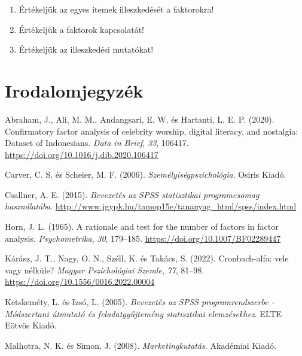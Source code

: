 \documentclass[
  letterpaper,
]{krantz}
\providecommand{\tightlist}{%
  \setlength{\itemsep}{0pt}\setlength{\parskip}{0pt}}\usepackage{longtable,booktabs,array}
\newlength{\cslhangindent}
\newlength{\cslentryspacingunit} %
\newenvironment{CSLReferences}[2] %
 {%
  \setlength{\parindent}{0pt}
  \ifodd #1
  \let\oldpar\par
  \def\par{\hangindent=\cslhangindent\oldpar}
  \fi
  \setlength{\parskip}{#2\cslentryspacingunit}
 }%
 {}
\begin{document}
\begin{enumerate}
\def\labelenumi{\arabic{enumi}.}
\tightlist
\item
  Értékeljük az egyes itemek illeszkedését a faktorokra!
\item
  Értékeljük a faktorok kapcsolatát!
\item
  Értékeljük az illeszkedési mutatókat!
\end{enumerate}

\hypertarget{irodalomjegyzuxe9k}{%
\chapter{Irodalomjegyzék}\label{irodalomjegyzuxe9k}}

\hypertarget{refs}{}
\begin{CSLReferences}{1}{0}
\leavevmode{}%
Abraham, J., Ali, M. M., Andangsari, E. W. és Hartanti, L. E. P. (2020).
Confirmatory factor analysis of celebrity worship, digital literacy, and
nostalgia: Dataset of Indonesians. \emph{Data in Brief}, \emph{33},
106417. \url{https://doi.org/10.1016/j.dib.2020.106417}

\leavevmode{}%
Carver, C. S. és Scheier, M. F. (2006). \emph{Személyiségpszichológia}.
Osiris Kiadó.

\leavevmode{}%
Csallner, A. E. (2015). \emph{Bevezetés az SPSS statisztikai
programcsomag használatába}.
\url{http://www.jgypk.hu/tamop15e/tananyag_html/spss/index.html}

\leavevmode{}%
Horn, J. L. (1965). A rationale and test for the number of factors in
factor analysis. \emph{Psychometrika}, \emph{30}, 179--185.
\url{https://doi.org/10.1007/BF02289447}

\leavevmode{}%
Kárász, J. T., Nagy, O. N., Széll, K. és Takács, S. (2022).
Cronbach-alfa: vele vagy nélküle? \emph{Magyar Pszichológiai Szemle},
\emph{77}, 81--98. \url{https://doi.org/10.1556/0016.2022.00004}

\leavevmode{}%
Ketskeméty, L. és Izsó, L. (2005). \emph{Bevezetés az SPSS
programrendszerbe - Módszertani útmutató és feladatgyűjtemény
statisztikai elemzésekhez}. ELTE Eötvös Kiadó.

\leavevmode{}%
Malhotra, N. K. és Simon, J. (2008). \emph{Marketingkutatás}. Akadémiai
Kiadó.


\end{CSLReferences}
\end{document}
